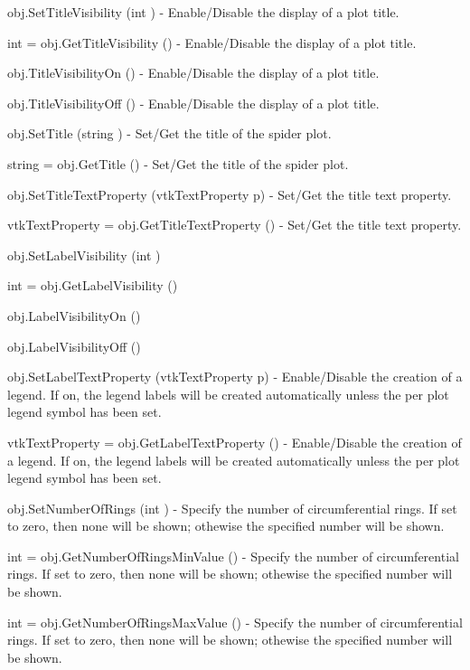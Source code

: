 \begin{DoxyItemize}
\item {\ttfamily obj.\-Set\-Title\-Visibility (int )} -\/ Enable/\-Disable the display of a plot title.  
\item {\ttfamily int = obj.\-Get\-Title\-Visibility ()} -\/ Enable/\-Disable the display of a plot title.  
\item {\ttfamily obj.\-Title\-Visibility\-On ()} -\/ Enable/\-Disable the display of a plot title.  
\item {\ttfamily obj.\-Title\-Visibility\-Off ()} -\/ Enable/\-Disable the display of a plot title.  
\item {\ttfamily obj.\-Set\-Title (string )} -\/ Set/\-Get the title of the spider plot.  
\item {\ttfamily string = obj.\-Get\-Title ()} -\/ Set/\-Get the title of the spider plot.  
\item {\ttfamily obj.\-Set\-Title\-Text\-Property (vtk\-Text\-Property p)} -\/ Set/\-Get the title text property.  
\item {\ttfamily vtk\-Text\-Property = obj.\-Get\-Title\-Text\-Property ()} -\/ Set/\-Get the title text property.  
\item {\ttfamily obj.\-Set\-Label\-Visibility (int )}  
\item {\ttfamily int = obj.\-Get\-Label\-Visibility ()}  
\item {\ttfamily obj.\-Label\-Visibility\-On ()}  
\item {\ttfamily obj.\-Label\-Visibility\-Off ()}  
\item {\ttfamily obj.\-Set\-Label\-Text\-Property (vtk\-Text\-Property p)} -\/ Enable/\-Disable the creation of a legend. If on, the legend labels will be created automatically unless the per plot legend symbol has been set.  
\item {\ttfamily vtk\-Text\-Property = obj.\-Get\-Label\-Text\-Property ()} -\/ Enable/\-Disable the creation of a legend. If on, the legend labels will be created automatically unless the per plot legend symbol has been set.  
\item {\ttfamily obj.\-Set\-Number\-Of\-Rings (int )} -\/ Specify the number of circumferential rings. If set to zero, then none will be shown; othewise the specified number will be shown.  
\item {\ttfamily int = obj.\-Get\-Number\-Of\-Rings\-Min\-Value ()} -\/ Specify the number of circumferential rings. If set to zero, then none will be shown; othewise the specified number will be shown.  
\item {\ttfamily int = obj.\-Get\-Number\-Of\-Rings\-Max\-Value ()} -\/ Specify the number of circumferential rings. If set to zero, then none will be shown; othewise the specified number will be shown.  

\end{DoxyItemize}
